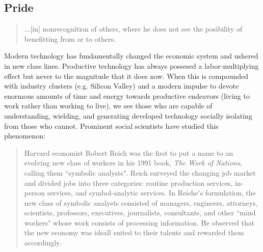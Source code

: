 \documentclass[letterpaper]{article}
\begin{document}
\hfill

\hfill

\hfill

\hfill

\hfill

\hfill

\subsection{Pride}
\begin{quote}
  ...[in] nonrecognition of others, where he does not see the posibility of benefitting from or to others.
\end{quote}

Modern technology has fundamentally changed the economic system and ushered in new class lines. Productive technology has always possesed a labor-multiplying effect but never to the magnitude that it does now. When this is compounded with industry clusters (e.g. Silicon Valley) and a modern impulse to devote enormous amounts of time and energy towards productive endeavors (living to work rather than working to live), we see those who are capable of understanding, wielding, and generating developed technology socially isolating from those who cannot. Prominent social scientists have studied this phenomenon:

\begin{quote}
  Harvard economist Robert Reich was the first to put a name to an evolving new class of workers in his 1991 book, \textit{The Work of Nations}, calling them ``symbolic analysts". Reich surveyed the changing job market and divided jobs into three categories: routine production services, in-person services, and symbol-analytic services. In Reiche's formulation, the new class of symbolic analysts consisted of managers, engineers, attorneys, scientists, professors, executives, journalists, consultants, and other ``mind workers" whose work consists of processing information. He observed that the new economy was ideall suited to their talents and rewarded them accordingly.
\end{quote}

\end{document}
